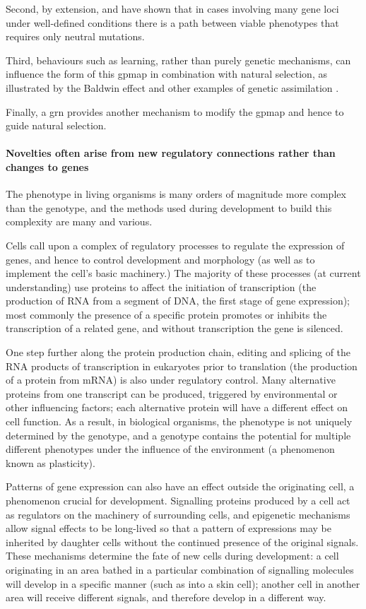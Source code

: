 Second, by extension, \parencite{Gavrilets:1997qt} and \parencite{Gravner:2007yd} have shown that in cases involving many gene loci under well-defined conditions there is a path between viable phenotypes that requires only neutral mutations.

Third, behaviours such as learning, rather than purely genetic mechanisms, can influence the form of this \gls{gpmap} in combination with natural selection, as illustrated by the Baldwin effect \parencite{Baldwin:1896ly} and other examples of genetic assimilation \cite{Hinton:1987vy,Siegal:2002qn,Waddington:1942jb}.

Finally, a \gls{grn} provides another mechanism to modify the \gls{gpmap} and hence to guide natural selection.

\paragraph{Novelties often arise from new regulatory connections rather than changes to genes}

The phenotype in living organisms is many orders of magnitude more complex than the genotype, and the methods used during development to build this complexity are many and various.

Cells call upon a complex of regulatory processes to regulate the expression of genes, and hence to control development and morphology (as well as to implement the cell's basic machinery.) The majority of these processes (at current understanding) use proteins to affect the initiation of transcription (the production of RNA from a segment of DNA, the first stage of gene expression); most commonly the presence of a specific protein promotes or inhibits the transcription of a related gene, and without transcription the gene is silenced.

One step further along the protein production chain, editing and splicing of the RNA products of transcription in eukaryotes prior to translation (the production of a protein from mRNA) is also under regulatory control. Many alternative proteins from one transcript can be produced, triggered by environmental or other influencing factors; each alternative protein will have a different effect on cell function. As a result, in biological organisms, the phenotype is not uniquely determined by the genotype, and a genotype contains the potential for multiple different phenotypes under the influence of the environment (a phenomenon known as plasticity).

Patterns of gene expression can also have an effect outside the originating cell, a phenomenon crucial for development. Signalling proteins produced by a cell act as regulators on the machinery of surrounding cells, and epigenetic mechanisms allow signal effects to be long-lived so that a pattern of expressions may be inherited by daughter cells without the continued presence of the original signals. These mechanisms determine the fate of new cells during development: a cell originating in an area bathed in a particular combination of signalling molecules will develop in a specific manner (such as into a skin cell); another cell in another area will receive different signals, and therefore develop in a different way.

